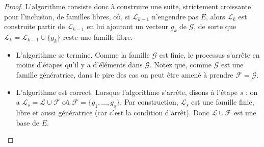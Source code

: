 \documentclass[class=report,crop=false]{standalone}
\begin{document}
\begin{proof}
L'algorithme consiste donc à construire une suite,
strictement croissante pour l'inclusion,
de familles libres, où,
si $\mathcal{L}_{k-1}$ n'engendre pas $E$, alors
$\mathcal{L}_{k}$ est construite partir de $\mathcal{L}_{k-1}$
en lui ajoutant un vecteur $g_k$ de $\mathcal{G}$,
de sorte que $\mathcal{L}_{k} = \mathcal{L}_{k-1} \cup \{g_{k}\}$ reste une famille libre.

\begin{itemize}
  \item L'algorithme se termine. Comme la famille $\mathcal{G}$ est finie,
  le processus s'arrête en moins d'étapes qu'il y a d'éléments dans $\mathcal{G}$.
  Notez que, comme $\mathcal{G}$ est une famille génératrice, dans le pire des cas
  on peut être amené à prendre $\mathcal{F}=\mathcal{G}$.

  \item L'algorithme est correct. Lorsque l'algorithme s'arrête, disons à l'étape $s$ :
  on a  $\mathcal{L}_s = \mathcal{L} \cup \mathcal{F}$ où
  $\mathcal{F} = \{g_1,\ldots,g_s\}$. Par construction, $\mathcal{L}_s$ est une famille finie, libre
  et aussi génératrice (car c'est la condition d'arrêt). Donc $\mathcal{L} \cup \mathcal{F}$
  est une base de $E$.
\end{itemize}
\end{proof}
\end{document}
